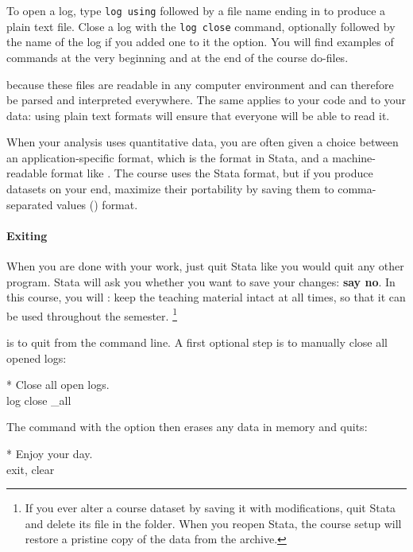To open a log, type \texttt{log using} followed by a file name ending in  to produce a plain text file. Close a log with the \texttt{log close} command, optionally followed by the name of the log if you added one to it the  option. You will find examples of  commands at the very beginning and at the end of the course do-files.%

%
 because these files are readable in any computer environment and can therefore be parsed and interpreted everywhere. The same applies to your code and to your data: using plain text formats will ensure that everyone will be able to read it.%

When your analysis uses quantitative data, you are often given a choice between an application-specific format, which is the  format in Stata, and a machine-readable format like . The course uses the Stata format, but if you produce datasets on your end, maximize their portability by saving them to comma-separated values () format.%

\paragraph{Exiting}

When you are done with your work, just quit Stata like you would quit any other program. Stata will ask you whether you want to save your changes: \textbf{say no}. In this course, you will : keep the teaching material intact at all times, so that it can be used throughout the semester.%
    \footnote{If you ever alter a course dataset by saving it with modifications, quit Stata and delete its  file in the \data folder. When you reopen Stata, the course setup will restore a pristine copy of the data from the \ZIP archive.}%

 is to quit from the command line. A first optional step is to manually close all opened logs:%

\begin{docspec}
  * Close all open logs.\\%
  log close \_all
\end{docspec}

The  command with the  option then erases any data in memory and quits:%

\begin{docspec}
  * Enjoy your day.\\%
  exit, clear
\end{docspec}

